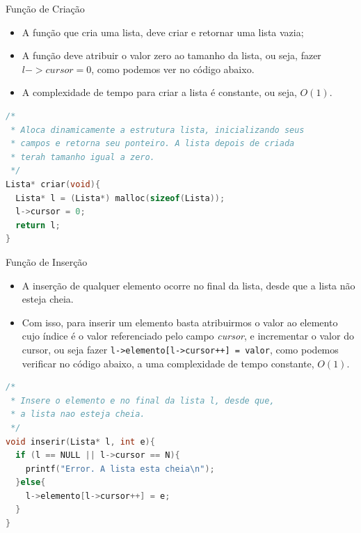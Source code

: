 \begin{frame}[fragile,c]{Função de Criação}
	\begin{itemize}
		\item A função que cria uma lista, deve criar e retornar uma lista vazia;
		\item A função deve atribuir o valor zero ao tamanho da lista, ou seja, fazer $l->cursor = 0$, como podemos ver no código abaixo.
		\item A complexidade de tempo para criar a lista é constante, ou seja, $O(1)$.
	\end{itemize}
\begin{lstlisting}[language=C]
/*
 * Aloca dinamicamente a estrutura lista, inicializando seus
 * campos e retorna seu ponteiro. A lista depois de criada
 * terah tamanho igual a zero.
 */
Lista* criar(void){
  Lista* l = (Lista*) malloc(sizeof(Lista));
  l->cursor = 0;
  return l;
}
\end{lstlisting}
\end{frame}

\begin{frame}[fragile,c]{Função de Inserção}  
	\begin{itemize}
		\item A inserção de qualquer elemento ocorre no final da lista, desde que a lista não esteja cheia.
		\item Com isso, para inserir um elemento basta atribuirmos o valor ao elemento cujo índice é o valor referenciado pelo campo \textit{cursor}, e incrementar o valor do cursor, ou seja fazer 
		\texttt{l->elemento[l->cursor++] = valor}, como podemos verificar no código abaixo, a uma complexidade de tempo constante, $O(1)$.
	\end{itemize}

\footnotesize
\begin{lstlisting}[language=C]
/*
 * Insere o elemento e no final da lista l, desde que,
 * a lista nao esteja cheia.
 */
void inserir(Lista* l, int e){
  if (l == NULL || l->cursor == N){
    printf("Error. A lista esta cheia\n");
  }else{
    l->elemento[l->cursor++] = e;
  }
}
\end{lstlisting}	
\end{frame}

